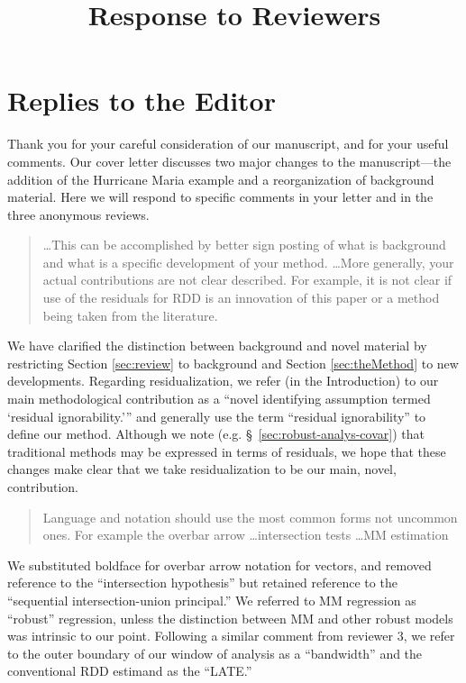 \documentclass[12pt]{article}
\title{Response to Reviewers}
\begin{document}
\maketitle



\section{Replies to the Editor}
Thank you for your careful consideration of our manuscript, and for
your useful comments. Our cover letter discusses two major changes to
the manuscript---the addition of the Hurricane Maria example and a
reorganization of background material. Here we will respond to
specific comments in your letter and in the three anonymous reviews.

\begin{quote}
\dots This can be accomplished by better sign posting of what
is background and what is a specific development of your
method.
\dots More generally, your actual contributions
are not clear described. For example, it is not clear if use of the
residuals for RDD is an innovation of this paper or a method being
taken from the literature.
\end{quote}
We have clarified the distinction between background and novel
material by restricting Section
\ref{sec:review} to background and Section \ref{sec:theMethod} to new
developments.
Regarding residualization, we refer (in the
Introduction) to our main
methodological contribution as a ``novel identifying assumption termed
`residual ignorability.''' and generally use the term ``residual
ignorability'' to define our method.
Although we note (e.g. \S~\ref{sec:robust-analys-covar}) that
traditional methods may be expressed in terms of residuals, we hope
that these changes make clear that we take residualization to be our
main, novel, contribution.

\begin{quote}
Language and notation should use the most common forms not
uncommon ones. For example the overbar arrow \dots intersection tests \dots MM
estimation
\end{quote}
We substituted boldface for overbar arrow notation for vectors, and removed reference to
the ``intersection hypothesis'' but retained reference to the
``sequential intersection-union principal.'' We referred to MM
regression as ``robust'' regression, unless the distinction between MM
and other robust models was intrinsic to our point. Following a
similar comment from reviewer 3, we refer to the outer boundary of our
window of analysis as a ``bandwidth'' and the conventional RDD
estimand as the ``LATE.''
\end{document}
